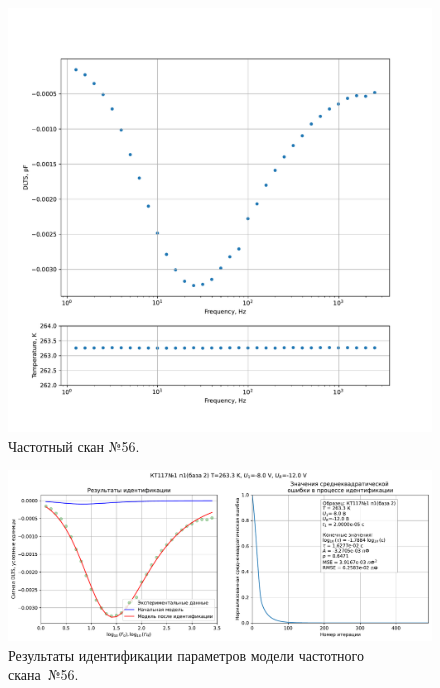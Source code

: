 \begin{figure}[!ht]
    \centering
    \includegraphics[width=1\textwidth]{../plots/КТ117№1_п1(база 2)_2500Гц-1Гц_1пФ_-10С_-8В-12В_50мВ_20мкс_шаг_0,1.pdf}
    \caption{Частотный скан №56.}
    \label{pic:frequency_scan_56}
\end{figure}

\begin{figure}[!ht]
    \centering
    \includegraphics[width=1\textwidth]{../plots/КТ117№1_п1(база 2)_2500Гц-1Гц_1пФ_-10С_-8В-12В_50мВ_20мкс_шаг_0,1_model.pdf}
    \caption{Результаты идентификации параметров модели частотного скана~№56.}
    \label{pic:frequency_scan_model56}
\end{figure}

\pagebreak


